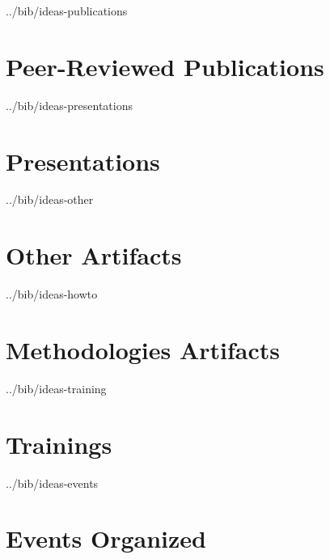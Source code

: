 \documentclass[11pt,letterpaper]{article}
\begin{document}



\newpage
\begin{btSect}{../bib/ideas-publications}
  \section{Peer-Reviewed Publications}
  \btPrintAll
\end{btSect}

\newpage
\begin{btSect}{../bib/ideas-presentations}
  \section{Presentations}
  \btPrintAll
\end{btSect}

\newpage
\begin{btSect}{../bib/ideas-other}
  \section{Other Artifacts}
  \btPrintAll
\end{btSect}

\newpage
\begin{btSect}{../bib/ideas-howto}
  \section{Methodologies Artifacts}
  \btPrintAll
\end{btSect}

\newpage
\begin{btSect}{../bib/ideas-training}
  \section{Trainings}
  \btPrintAll
\end{btSect}

\newpage
\begin{btSect}{../bib/ideas-events}
  \section{Events Organized}
  \btPrintAll
\end{btSect}
\end{document}
